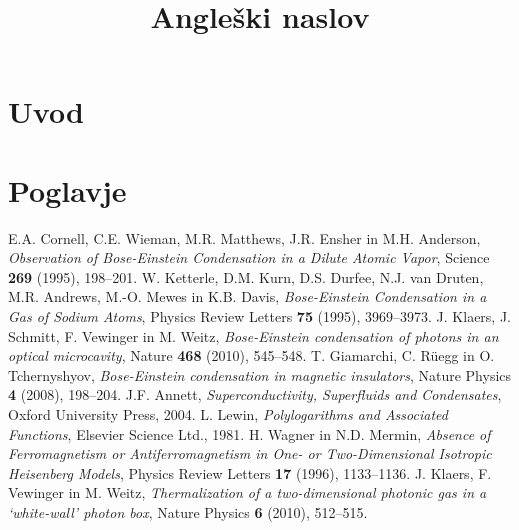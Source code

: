 \documentclass[twoside,11pt]{article}
\begin{document}



\klasifikacija{~} 
\title{Angleški naslov}

\glava\baselineskip=14.5pt

\smallskip

\section{Uvod}

\section{Poglavje}

\begin{thebibliography}{99}

 E.A. Cornell, C.E. Wieman, M.R. Matthews, J.R. Ensher in M.H. Anderson, \emph{Observation of Bose-Einstein Condensation in a Dilute Atomic Vapor}, Science \textbf{269} (1995), 198--201. 
 W. Ketterle, D.M. Kurn, D.S. Durfee, N.J. van Druten, M.R. Andrews, M.-O. Mewes in K.B. Davis, \emph{Bose-Einstein Condensation in a Gas of Sodium Atoms}, Physics Review Letters \textbf{75} (1995), 3969--3973. 
 J. Klaers, J. Schmitt, F. Vewinger in M. Weitz, \emph{Bose-Einstein condensation of photons in an optical microcavity}, Nature \textbf{468} (2010), 545--548. 
 T. Giamarchi, C. R\"uegg in O. Tchernyshyov, \emph{Bose-Einstein condensation in magnetic insulators}, Nature Physics \textbf{4} (2008), 198--204. 
 J.F. Annett, \emph{Superconductivity, Superfluids and Condensates}, Oxford University Press, 2004.
 L. Lewin, \emph{Polylogarithms and Associated Functions}, Elsevier Science Ltd., 1981. 
 H. Wagner in N.D. Mermin, \emph{Absence of Ferromagnetism or Antiferromagnetism in One- or Two-Dimensional Isotropic Heisenberg Models}, Physics Review Letters  \textbf{17} (1996), 1133--1136.
 J. Klaers, F. Vewinger in M. Weitz, \emph{Thermalization of a two-dimensional photonic gas in a ‘white-wall’ photon box}, Nature Physics \textbf{6} (2010), 512--515.

\end{thebibliography}
\end{document}
